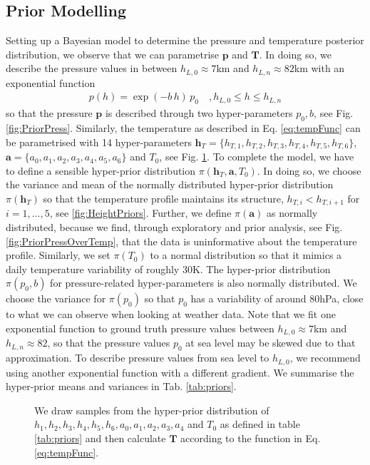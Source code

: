 \subsection{Prior Modelling}
Setting up a Bayesian model to determine the pressure and temperature posterior distribution, we observe that we can parametrise $\bm{p}$ and $\bm{T}$.
In doing so, we describe the pressure values in between $h_{L,0} \approx 7$km and $h_{L,n} \approx 82$km with an exponential function
\begin{align}
	p(h) =
	\exp \left( -b \, h \right)   \,  p_0 \quad ,h_{L,0}  \leq h \leq h_{L,n}
	\label{eq:pressFunc}
\end{align}
so that the pressure $\bm{p}$ is described through two hyper-parameters $p_0,b$, see Fig. \ref{fig:PriorPress}.
Similarly, the temperature as described in Eq. \ref{eq:tempFunc} can be parametrised with 14 hyper-parameters  $\bm{h}_T = \{ h_{T,1}, h_{T,2},h_{T,3},h_{T,4},h_{T,5},h_{T,6} \}$, $\bm{a} = \{a_0, a_1, a_2,a_3,a_4,a_5,a_6 \} $ and $T_0$, see Fig. \ref{fig:PriorTemp}.
To complete the model, we have to define a sensible hyper-prior distribution $\pi(\bm{h}_T, \bm{a}, T_0)$.
In doing so, we choose the variance and mean of the normally distributed hyper-prior distribution $\pi(\bm{h}_T)$ so that the temperature profile maintains its structure, $ h_{T, i} < h_{T, i+1}$ for $i = 1,\dots, 5$, see \ref{fig:HeightPriors}.
Further, we define $\pi(\bm{a})$ as normally distributed, because we find, through exploratory and prior analysis, see Fig. \ref{fig:PriorPressOverTemp}, that the data is uninformative about the temperature profile.
Similarly, we set $\pi(T_0)$ to a normal distribution so that it mimics a daily temperature variability of roughly 30K.
The hyper-prior distribution $\pi(p_0, b)$ for pressure-related hyper-parameters is also normally distributed.
We choose the variance for $\pi(p_0)$ so that $p_0$ has a variability of around 80hPa, close to what we can observe when looking at weather data.
Note that we fit one exponential function to ground truth pressure values between $h_{L,0} \approx 7$km and $h_{L,n} \approx 82$, so that the pressure values $p_0$ at sea level may be skewed due to that approximation.
To describe pressure values from sea level to $h_{L,0}$, we recommend using another exponential function with a different gradient.
We summarise the hyper-prior means and variances in Tab. \ref{tab:priors}.
\begin{figure}[ht!]
	\centering
	
	\caption[Prior Samples of $\bm{T}$ according to the respective hyper-prior distribution.]{We draw samples from the hyper-prior distribution of $h_1, h_2,h_3,h_4,h_5,h_6, a_0, a_1, a_2,a_3,a_4$ and $T_0$ as defined in table \ref{tab:priors} and then calculate $\bm{T}$ according to the function in Eq. \ref{eq:tempFunc}.}
	\label{fig:PriorTemp}
\end{figure}

